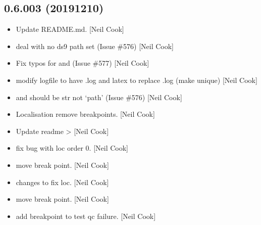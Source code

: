 \documentclass[a4paper,10pt,english]{report}
\begin{document}
\subsection{0.6.003 (2019\sphinxhyphen{}12\sphinxhyphen{}10)}
\label{\detokenize{misc/changelog:id35}}\begin{itemize}
\item {} 
Update README.md. {[}Neil Cook{]}

\item {} 
 \sphinxhyphen{} deal with no ds9 path set
(Issue \#576) {[}Neil Cook{]}

\item {} 
Fix typos for  and  (Issue \#577) {[}Neil Cook{]}

\item {} 
 \sphinxhyphen{} modify logfile to have .log
and latex to replace .log (make unique) {[}Neil Cook{]}

\item {} 
 \sphinxhyphen{}  and
 should be str not ‘path’ (Issue \#576) {[}Neil Cook{]}

\item {} 
Localisation \sphinxhyphen{} remove breakpoints. {[}Neil Cook{]}

\item {} 
Update readme  \textendash{}\textgreater{}  {[}Neil Cook{]}

\item {} 
 \sphinxhyphen{} fix bug with loc order 0. {[}Neil Cook{]}

\item {} 
 \sphinxhyphen{} move break point. {[}Neil Cook{]}

\item {} 
 \sphinxhyphen{} changes to fix loc. {[}Neil Cook{]}

\item {} 
 \sphinxhyphen{} move break point. {[}Neil Cook{]}

\item {} 
 \sphinxhyphen{} add breakpoint to test qc failure. {[}Neil Cook{]}


\end{itemize}
\end{document}
